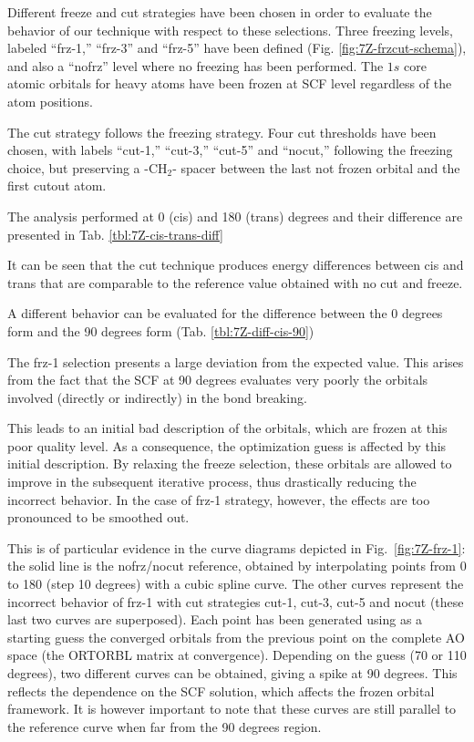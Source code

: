 Different freeze and cut strategies have been chosen in order to evaluate
the behavior of our technique with respect to these selections.
Three freezing levels, labeled ``frz-1,'' ``frz-3'' and ``frz-5'' have been
defined (Fig. \ref{fig:7Z-frzcut-schema}), and also a ``nofrz'' level
where no freezing has been performed.  The $1s$ core atomic orbitals for heavy
atoms have been frozen at SCF level regardless of the atom positions.

The cut strategy follows the freezing strategy. Four cut thresholds have
been chosen, with labels ``cut-1,'' ``cut-3,'' ``cut-5'' and ``nocut,''
following the freezing choice, but preserving a -CH$_2$-
spacer between the last not frozen orbital and the first cutout atom.

The analysis performed at 0 (cis) and 180 (trans) degrees and their
difference are presented in Tab. \ref{tbl:7Z-cis-trans-diff}



It can be seen that the cut technique produces energy differences between
cis and trans that are comparable to the reference value obtained with no
cut and freeze.

A different behavior can be evaluated for the difference between the 0 degrees
form and the 90 degrees form (Tab. \ref{tbl:7Z-diff-cis-90})



The frz-1 selection presents a large deviation from the expected value. This
arises from the fact that the SCF at 90 degrees evaluates very poorly the
orbitals involved (directly or indirectly) in the bond breaking. 

This leads to an initial bad description of the orbitals, which are frozen
at this poor quality level. As a consequence, the optimization guess is
affected by this initial description. By relaxing the freeze selection,
these orbitals are allowed to improve in the subsequent iterative process,
thus drastically reducing the incorrect behavior. In the case of frz-1
strategy, however, the effects are too pronounced to be smoothed out.



This is of particular evidence in the curve diagrams depicted in
Fig.~\ref{fig:7Z-frz-1}: the solid line is the nofrz/nocut reference,
obtained by interpolating points from 0 to 180 (step 10 degrees) with a
cubic spline curve. The other curves represent the incorrect behavior of
frz-1 with cut strategies cut-1, cut-3, cut-5 and nocut (these last two
curves are superposed).  Each point has been generated using as a starting
guess the converged orbitals from the previous point on the complete AO
space (the ORTORBL matrix at convergence). Depending on the guess (70 or 110
degrees), two different curves can be obtained, giving a spike at 90
degrees.  This reflects the dependence on the SCF solution, which affects
the frozen orbital framework. It is however important to note that these
curves are still parallel to the reference curve when far from the 90
degrees region. 

